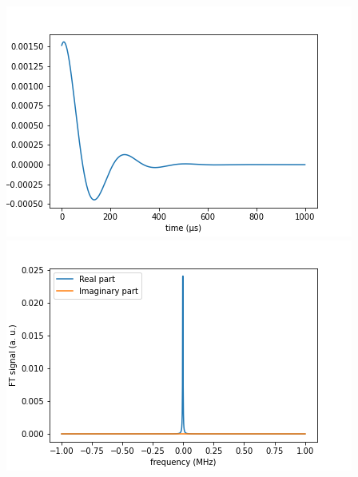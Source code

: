 \documentclass[10pt]{beamer}
\begin{document}
\begin{frame}
\begin{columns}[T]
\begin{column}{.5\textwidth}
\begin{column}{.5\textwidth}
\end{column}
\end{column}
\begin{column}{.5\textwidth}
\includegraphics[width=\textwidth]{./spin1-2/41correlated_mixed_no_interaction/FIDSignal.png}
\includegraphics[width=\textwidth]{./spin1-2/41correlated_mixed_no_interaction/FTSignal.png}
\end{column}
\end{columns}
\end{frame}
\end{document}
